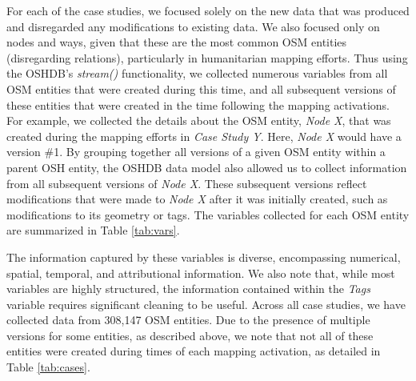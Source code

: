 For each of the case studies, we focused solely on the new data that was produced and disregarded any modifications to existing data. We also focused only on nodes and ways, given that these are the most common OSM entities (disregarding relations), particularly in humanitarian mapping efforts. Thus using the OSHDB's \textit{stream()} functionality, we collected numerous variables from all OSM entities that were created during this time, and all subsequent versions of these entities that were created in the time following the mapping activations. For example, we collected the details about the OSM entity, \textit{Node X}, that was created during the mapping efforts in \textit{Case Study Y}. Here, \textit{Node X} would have a version \#1. By grouping together all versions of a given OSM entity within a parent OSH entity, the OSHDB data model also allowed us to collect information from all subsequent versions of \textit{Node X}. These subsequent versions reflect modifications that were made to \textit{Node X} after it was initially created, such as modifications to its geometry or tags. The variables collected for each OSM entity are summarized in Table \ref{tab:vars}. 

The information captured by these variables is diverse, encompassing numerical, spatial, temporal, and attributional information. We also note that, while most variables are highly structured, the information contained within the \textit{Tags} variable requires significant cleaning to be useful. Across all case studies, we have collected data from 308,147 OSM entities. Due to the presence of multiple versions for some entities, as described above, we note that not all of these entities were created during times of each mapping activation, as detailed in Table \ref{tab:cases}.

